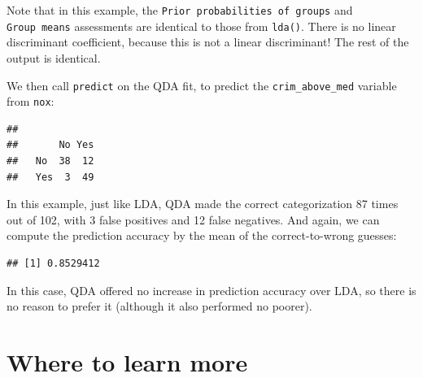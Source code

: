 \documentclass[
]{book}
\newenvironment{Shaded}{\begin{snugshade}}{\end{snugshade}}
\newcommand{\FunctionTok}[1]{\textcolor[rgb]{0.00,0.00,0.00}{#1}}
\newcommand{\NormalTok}[1]{#1}
\newcommand{\OtherTok}[1]{\textcolor[rgb]{0.56,0.35,0.01}{#1}}
\newcommand{\SpecialCharTok}[1]{\textcolor[rgb]{0.00,0.00,0.00}{#1}}
\begin{document}
Note that in this example, the \texttt{Prior\ probabilities\ of\ groups} and \texttt{Group\ means} assessments are identical to those from \texttt{lda()}. There is no linear discriminant coefficient, because this is not a linear discriminant! The rest of the output is identical.

We then call \texttt{predict} on the QDA fit, to predict the \texttt{crim\_above\_med} variable from \texttt{nox}:

\begin{Shaded}
\end{Shaded}

\begin{verbatim}
##      
##       No Yes
##   No  38  12
##   Yes  3  49
\end{verbatim}

In this example, just like LDA, QDA made the correct categorization 87 times out of 102, with 3 false positives and 12 false negatives. And again, we can compute the prediction accuracy by the mean of the correct-to-wrong guesses:

\begin{Shaded}
\end{Shaded}

\begin{verbatim}
## [1] 0.8529412
\end{verbatim}

In this case, QDA offered no increase in prediction accuracy over LDA, so there is no reason to prefer it (although it also performed no poorer).

\hypertarget{where-to-learn-more-4}{%
\section{Where to learn more}\label{where-to-learn-more-4}}
\end{document}

